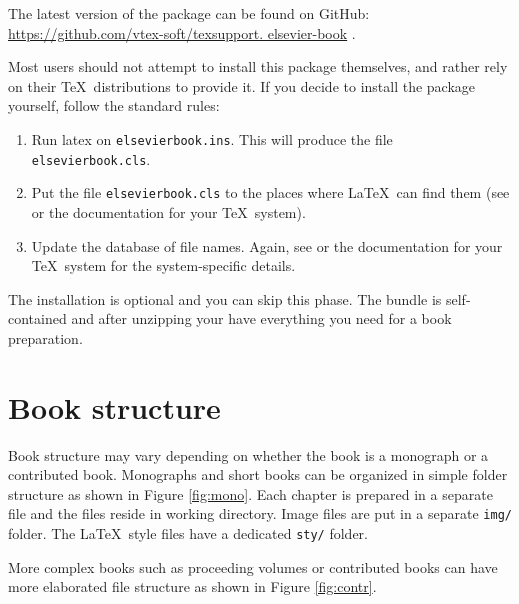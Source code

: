 \documentclass{ltxdoc}
\def\file#1{\texttt{#1}}
\begin{document}
The latest version of the package can be found on GitHub:
 \url{https://github.com/vtex-soft/texsupport. elsevier-book}%
. 

Most users should not attempt to install this package themselves, and rather rely on
their \TeX\ distributions to provide it. If you decide to install the package yourself, follow
the standard rules:
\begin{enumerate}
\item Run latex on \file{elsevierbook.ins}. This will produce the file \file{elsevierbook.cls}.
\item Put the file \file{elsevierbook.cls}  to the places where \LaTeX\ 
can find them (see \cite{ref:ukfaq} or the documentation for your \TeX\ system).
\item Update the database of file names. Again, see \cite{ref:ukfaq} or the documentation for your
\TeX\ system for the system-specific details.
\end{enumerate}


The installation is optional and you can skip this phase.
The bundle is self-contained and after unzipping your have everything you need for a book preparation. 


\section{Book structure}\label{bookstructure}

Book structure may vary depending on whether the book is a monograph or a contributed book. 
Monographs and short books can be organized in simple folder structure as shown in Figure 
\ref{fig:mono}.
Each chapter is prepared in a separate file and the files reside in working directory. 
Image files are put in a separate \file{img/} folder. 
The \LaTeX\ style files have a dedicated \file{sty/} folder.

More complex books such as proceeding volumes or contributed books can have more 
elaborated file structure as shown in Figure \ref{fig:contr}.
\end{document}
